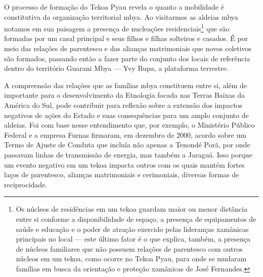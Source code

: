 O processo de formação do Tekoa Pyau revela o quanto a mobilidade é
constitutiva da organização territorial mbya. Ao visitarmos as aldeias
mbya notamos em sua paisagem a presença de nucleações
residenciais\footnote{Os núcleos de residências em um tekoa guardam
maior ou menor distância entre si conforme a disponibilidade de espaço,
a presença de equipamentos de saúde e educação e o poder de atração
exercido pelas lideranças xamânicas principais no local --- este último
fator é o que explica, também, a presença de núcleos familiares que não
possuem relações de parentesco com outros núcleos em um tekoa, como
ocorre no Tekoa Pyau, para onde se mudaram famílias em busca da
orientação e proteção xamânicas de José Fernandes.} que são formadas
por um casal principal e seus filhos e filhas solteiros e casados. É
por meio das relações de parentesco e das alianças matrimoniais que
novos coletivos são formados, passando então a fazer parte do conjunto
dos locais de referência dentro do território Guarani Mbya --- Yvy Rupa,
a plataforma terrestre.

A compreensão das relações que as famílias mbya constituem entre si,
além de importante para o desenvolvimento da Etnologia focada nas
Terras Baixas da América do Sul, pode contribuir para reflexão sobre a
extensão dos impactos negativos de ações do Estado e suas consequências
para um amplo conjunto de aldeias. Foi com base nesse entendimento que,
por exemplo, o Ministério Público Federal e a empresa Furnas firmaram,
em dezembro de 2000, acordo sobre um Termo de Ajuste de Conduta que
incluía não apenas a  Tenondé Porã, por onde passavam linhas de
transmissão de energia, mas também a  Jaraguá. Isso porque um evento
negativo em um tekoa impacta outros com os quais mantém fortes laços de
parentesco, alianças matrimoniais e cerimoniais, diversas formas de
reciprocidade.


